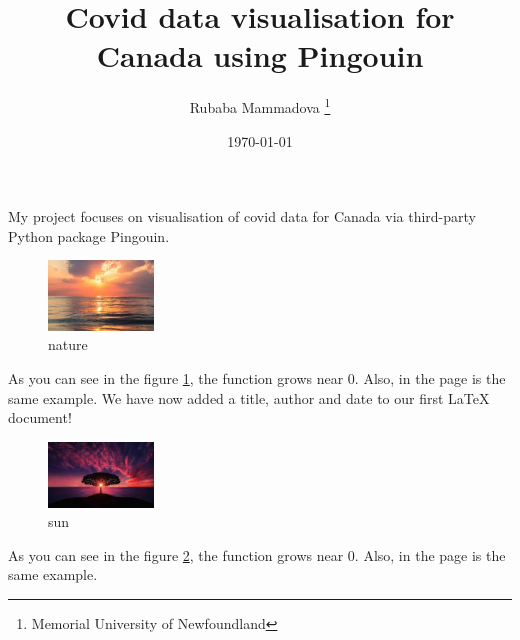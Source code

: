 \documentclass[12pt, letterpaper, twoside]{article}
\title{Covid data visualisation for Canada using Pingouin}
\author{Rubaba Mammadova \thanks{Memorial University of Newfoundland}}
\date{\today}
\begin{document}
\maketitle
My project focuses on visualisation of covid data for Canada via third-party Python package Pingouin.
 \begin{figure}[h]
    \centering
    \includegraphics[width=0.25\textwidth]{myplot1.jpg}
    \caption{nature}
    \label{fig:myplot1 label}
\end{figure}
 
As you can see in the figure \ref{fig:myplot1 label}, the 
function grows near 0. Also, in the page \pageref{fig:myplot1 label} 
is the same example.
We have now added a title, author and date to our first \LaTeX{} document!
 \begin{figure}[h]
    \centering
    \includegraphics[width=0.25\textwidth]{myplot2.jpg}
    \caption{sun}
    \label{fig:sun}
\end{figure}
 
As you can see in the figure \ref{fig:sun}, the 
function grows near 0. Also, in the page \pageref{fig:sun} 
is the same example.
\end{document}
